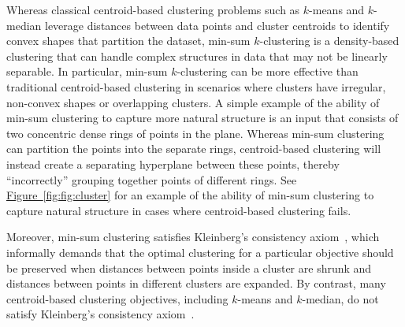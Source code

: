 \documentclass[11pt]{article}
\newcommand{\namedref}[2]{\hyperref[#2]{#1~\ref*{#2}}}
\newcommand{\figref}[1]{\namedref{Figure}{fig:#1}}
\begin{document}
Whereas classical centroid-based clustering problems such as $k$-means and $k$-median leverage distances between data points and cluster centroids to identify convex shapes that partition the dataset, min-sum $k$-clustering is a density-based clustering that can handle complex structures in data that may not be linearly separable. 
In particular, min-sum $k$-clustering can be more effective than traditional centroid-based clustering in scenarios where clusters have irregular, non-convex shapes or overlapping clusters.
A simple example of the ability of min-sum clustering to capture more natural structure is an input that consists of two concentric dense rings of points in the plane. 
Whereas min-sum clustering can partition the points into the separate rings, centroid-based clustering will instead create a separating hyperplane between these points, thereby ``incorrectly'' grouping together points of different rings. 
See \figref{fig:cluster} for an example of the ability of min-sum clustering to capture natural structure in cases where centroid-based clustering fails. 

Moreover, min-sum clustering satisfies Kleinberg’s consistency axiom~\cite{Kleinberg02}, which informally demands that the optimal clustering for a particular objective should be preserved when distances between points inside a cluster are shrunk and distances between points in different clusters are expanded. 
By contrast, many centroid-based clustering objectives, including $k$-means and $k$-median, do not satisfy Kleinberg's consistency axiom~\cite{MahajanNV12}. 
\end{document}
